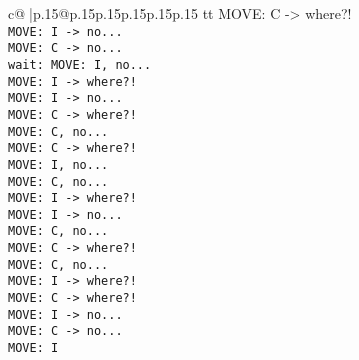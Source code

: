 \documentclass{article}
\begin{document}
{\begin{supertabular}{c@{$\;$}|p{.15\linewidth}@{}p{.15\linewidth}p{.15\linewidth}p{.15\linewidth}p{.15\linewidth}p{.15\linewidth}}
{{{tt  MOVE: C -> where?!\\ \tt  MOVE: I -> no...\\ \tt  MOVE: C -> no...\\ \tt  wait: MOVE: I, no...\\ \tt  MOVE: I -> where?!\\ \tt  MOVE: I -> no...\\ \tt  MOVE: C -> where?!\\ \tt  MOVE: C, no...\\ \tt  MOVE: C -> where?!\\ \tt  MOVE: I, no...\\ \tt  MOVE: C, no...\\ \tt  MOVE: I -> where?!\\ \tt  MOVE: I -> no...\\ \tt  MOVE: C, no...\\ \tt  MOVE: C -> where?!\\ \tt  MOVE: C, no...\\ \tt  MOVE: I -> where?!\\ \tt  MOVE: C -> where?!\\ \tt  MOVE: I -> no...\\ \tt  MOVE: C -> no...\\ \tt  MOVE: I}}}
\end{supertabular}}
\end{document}
